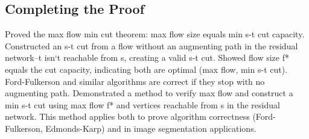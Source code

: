 \subsection*{Completing the Proof}
Proved the max flow min cut theorem: max flow size equals min s-t cut capacity.
Constructed an s-t cut from a flow without an augmenting path in the residual network--t isn`t reachable from s, creating a valid s-t cut.
Showed flow size f* equals the cut capacity, indicating both are optimal (max flow, min s-t cut).
Ford-Fulkerson and similar algorithms are correct if they stop with no augmenting path.
Demonstrated a method to verify max flow and construct a min s-t cut using max flow f* and vertices reachable from s in the residual network.
This method applies both to prove algorithm correctness (Ford-Fulkerson, Edmonds-Karp) and in image segmentation applications.

